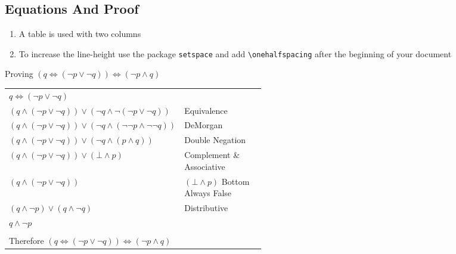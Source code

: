 \documentclass[12pt]{report}
\begin{document}
	\begin{center}
		\section*{Equations And Proof}
	\end{center}
	
	\begin{enumerate}
		\item A table is used with two columns
		\item To increase the line-height use the package \texttt{setspace} and add \texttt{\textbackslash onehalfspacing} after the beginning of your document
	\end{enumerate}
	
	\begin{center}
		Proving $(q \Leftrightarrow (\neg p \lor \neg q)) \Leftrightarrow (\neg p \land q)$
		\begin{tabular}{l p{0.5\linewidth}}
			$q \Leftrightarrow (\neg p \lor \neg q)$ \\
			$(q \land (\neg p \lor \neg q)) \lor (\neg q \land \neg(\neg p \lor \neg q))$  & Equivalence \\
			$(q \land (\neg p \lor \neg q)) \lor (\neg q \land (\neg\neg p \land \neg\neg q))$ & DeMorgan \\
			$ (q \land (\neg p \lor \neg q)) \lor (\neg q \land (p \land q)) $ & Double Negation \\
			$(q \land (\neg p \lor \neg q)) \lor (\bot \land p) $  & Complement \& Associative \\
			$(q \land (\neg p \lor \neg q))$ & $(\bot \land p)$ Bottom Always False \\
			$(q \land \neg p) \lor (q \land \neg q)$ & Distributive \\
			$q \land \neg p$ \\
			\\
			Therefore $(q \Leftrightarrow (\neg p \lor \neg q)) \Leftrightarrow (\neg p \land q)$
		\end{tabular}
    \end{center}
	
\end{document}
